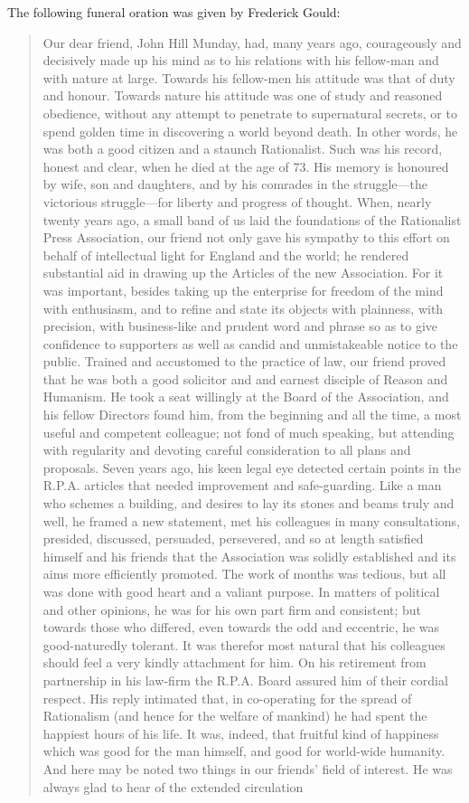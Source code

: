 The following funeral oration was given by Frederick Gould:\cite{JohnHillMundayFuneral}
 
\begin{quotation}
Our dear friend, John Hill Munday, had, many years ago, courageously and decisively made up his mind as to his relations with his fellow-man and with nature at large. Towards his fellow-men his attitude was that of duty and honour. Towards nature his attitude was one of study and reasoned obedience, without any attempt to penetrate to supernatural secrets, or to spend golden time in discovering a world beyond death. In other words, he was both a good citizen and a staunch Rationalist. Such was his record, honest and clear, when he died at the age of 73. His memory is honoured by wife, son and daughters, and by his comrades in the struggle---the victorious struggle---for liberty and progress of thought. When, nearly twenty years ago, a small band of us laid the foundations of the Rationalist Press Association, our friend not only gave his sympathy to this effort on behalf of intellectual light for England and the world; he rendered substantial aid in drawing up the Articles of the new Association. For it was important, besides taking up the enterprise for freedom of the mind with enthusiasm, and to refine and state its objects with plainness, with precision, with business-like and prudent word and phrase so as to give confidence to supporters as well as candid and unmistakeable notice to the public. Trained and accustomed to the practice of law, our friend proved that he was both a good solicitor and and earnest disciple of Reason and Humanism. He took a seat willingly at the Board of the Association, and his fellow Directors found him, from the beginning and all the time, a most useful and competent colleague; not fond of much speaking, but attending with regularity and devoting careful consideration to all plans and proposals. Seven years ago, his keen legal eye detected certain points in the R.P.A. articles that needed improvement and safe-guarding. Like a man who schemes a building, and desires to lay its stones and beams truly and well, he framed a new statement, met his colleagues in many consultations, presided, discussed, persuaded, persevered, and so at length satisfied himself and his friends that the Association was solidly established and its aims more efficiently promoted. The work of months was tedious, but all was done with good heart and a valiant purpose. In matters of political and other opinions, he was for his own part firm and consistent; but towards those who differed, even towards the odd and eccentric, he was good-naturedly tolerant. It was therefor most natural that his colleagues should feel a very kindly attachment for him. On his retirement from partnership in his law-firm the R.P.A. Board assured him of their cordial respect. His reply intimated that, in co-operating for the spread of Rationalism (and hence for the welfare of mankind) he had spent the happiest hours of his life. It was, indeed, that fruitful kind of happiness which was good for the man himself, and good for world-wide humanity. And here may be noted two things in our friends' field of interest. He was always glad to hear of the extended circulation 
\end{quotation}
